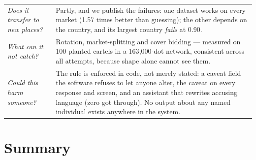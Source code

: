 \documentclass[11pt,a4paper]{article}
\begin{document}
\begin{longtable}{@{}p{5.0cm}p{10.5cm}@{}}
\addlinespace
\emph{Does it transfer to new places?} & Partly, and we publish the failures: one
dataset works on every market (1.57 times better than guessing); the other depends
on the country, and its largest country \emph{fails} at 0.90. \\
\addlinespace
\emph{What can it not catch?} & Rotation, market-splitting and cover bidding ---
measured on 100 planted cartels in a 163{,}000-dot network, consistent across all
attempts, because shape alone cannot see them. \\
\addlinespace
\emph{Could this harm someone?} & The rule is enforced in code, not merely stated:
a caveat field the software refuses to let anyone alter, the caveat on every
response and screen, and an assistant that rewrites accusing language (zero got
through). No output about any named individual exists anywhere in the system. \\
\bottomrule
\end{longtable}

\section{Summary}
\end{document}

